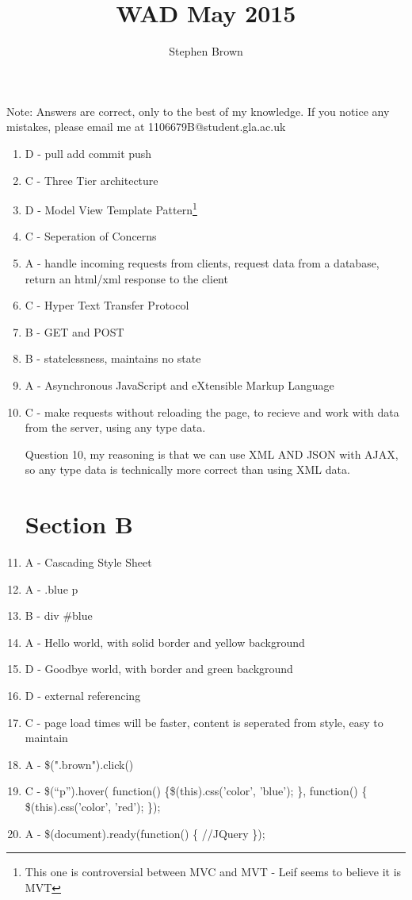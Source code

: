 \documentclass{article}
\title{WAD May 2015}
\author{Stephen Brown}
\begin{document}
\maketitle

Note: Answers are correct, only to the best of my knowledge. If you notice any mistakes, please email me at 1106679B@student.gla.ac.uk

\begin{enumerate}
\section{Section A}
\item{D - pull add commit push}
\item{C - Three Tier architecture}
\item{D - Model View Template Pattern}\footnote{This one is controversial between MVC and MVT - Leif seems to believe it is MVT}
\item{C - Seperation of Concerns}
\item{A - handle incoming requests from clients, request data from a database, return an html/xml response to the client}
\item{C - Hyper Text Transfer Protocol}
\item{B - GET and POST}
\item{B - statelessness, maintains no state}
\item{A - Asynchronous JavaScript and eXtensible Markup Language}
\item{C - make requests without reloading the page, to recieve and work with data from the server, using any type data.}

Question 10, my reasoning is that we can use XML AND JSON with AJAX, so any type data is technically more correct than using XML data.

\section{Section B}
\item A - Cascading Style Sheet
\item A - .blue p
\item B - div \#blue
\item A - Hello world, with solid border and yellow background
\item D - Goodbye world, with border and green background
\item D - external referencing
\item C - page load times will be faster, content is seperated from style, easy to maintain
\item A - \$(".brown").click()
\item C - \$(``p'').hover( function() \{\$(this).css('color', 'blue'); \}, function() \{ \$(this).css('color', 'red'); \});
\item A - \$(document).ready(function() \{ //JQuery \});


\end{enumerate}
\end{document}

